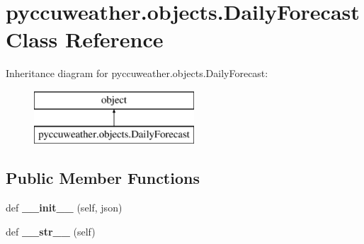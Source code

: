 \hypertarget{classpyccuweather_1_1objects_1_1_daily_forecast}{}\section{pyccuweather.\+objects.\+Daily\+Forecast Class Reference}
\label{classpyccuweather_1_1objects_1_1_daily_forecast}
Inheritance diagram for pyccuweather.\+objects.\+Daily\+Forecast\+:\begin{figure}[H]
\begin{center}
\leavevmode
\includegraphics[height=2.000000cm]{classpyccuweather_1_1objects_1_1_daily_forecast}
\end{center}
\end{figure}
\subsection*{Public Member Functions}
\begin{DoxyCompactItemize}
\item 
\hypertarget{classpyccuweather_1_1objects_1_1_daily_forecast_a7591fefff1ddb8d49686b41c41c8da6a}{}def {\bfseries \+\_\+\+\_\+init\+\_\+\+\_\+} (self, json)\label{classpyccuweather_1_1objects_1_1_daily_forecast_a7591fefff1ddb8d49686b41c41c8da6a}

\item 
\hypertarget{classpyccuweather_1_1objects_1_1_daily_forecast_aa0b65f9fec13254b3b183e3fe284ba7b}{}def {\bfseries \+\_\+\+\_\+str\+\_\+\+\_\+} (self)\label{classpyccuweather_1_1objects_1_1_daily_forecast_aa0b65f9fec13254b3b183e3fe284ba7b}

\end{DoxyCompactItemize}

